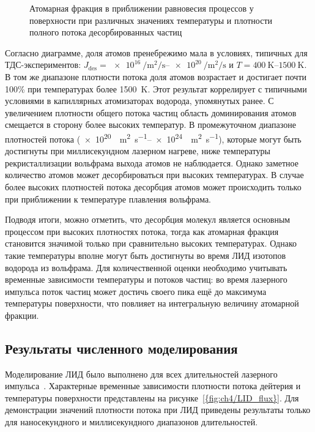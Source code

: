 \begin{figure}[ht]
    \caption{Атомарная фракция в приближении равновесия процессов у поверхности при различных значениях температуры и плотности полного потока десорбированных частиц}\label{fig:ch4/atomic_fraction_diagram}
\end{figure}

Согласно диаграмме, доля атомов пренебрежимо мала в условиях, типичных для ТДС-экспериментов: \(J_\mathrm{des} = \SIrange{e16}{e20}{\per\meter\squared\per\second}\) и \( T = \SIrange{400}{1500}{\kelvin} \). В том же диапазоне плотности потока доля атомов возрастает и достигает почти 100\% при температурах более \SI{1500}{\kelvin}. Этот результат коррелирует с типичными условиями в капиллярных атомизаторах водорода, упомянутых ранее. С увеличением плотности общего потока частиц область доминирования атомов смещается в сторону более высоких температур. В промежуточном диапазоне плотностей потока (\SIrange{e20}{e24}{\per\meter\squared\per\second}), которые могут быть достигнуты при миллисекундном лазерном нагреве, ниже температуры рекристаллизации вольфрама выхода атомов не наблюдается. Однако заметное количество атомов может десорбироваться при высоких температурах. В случае более высоких плотностей потока десорбция атомов может происходить только при приближении к температуре плавления вольфрама.

Подводя итоги, можно отметить, что десорбция молекул является основным процессом при высоких плотностях потока, тогда как атомарная фракция становится значимой только при сравнительно высоких температурах. Однако такие температуры вполне могут быть достигнуты во время ЛИД изотопов водорода из вольфрама. Для количественной оценки необходимо учитывать временные зависимости температуры и потоков частиц: во время лазерного импульса поток частиц может достичь своего пика ещё до максимума температуры поверхности, что повлияет на интегральную величину атомарной фракции.

\subsection{Результаты численного моделирования}\label{subsec:ch4/seс2/subsec3}

Моделирование ЛИД было выполнено для всех длительностей лазерного импульса~\cite{Kulagin2022b}. Характерные временные зависимости плотности потока дейтерия и температуры поверхности  представлены на рисунке~\cref{{fig:ch4/LID_flux}}. Для демонстрации значений плотности потока при ЛИД приведены результаты только для наносекундного и миллисекундного диапазонов длительностей.


